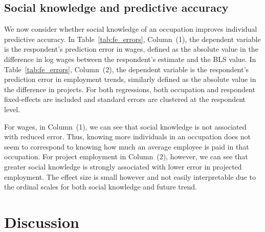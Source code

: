 \documentclass[11pt]{article}
\begin{document}


\subsection{Social knowledge and predictive accuracy}

We now consider whether social knowledge of an occupation improves individual predictive accuracy. 
In Table~\ref{tab:fe_errors}, Column~(1), the dependent variable is the respondent's prediction error in wages, defined as the absolute value in the difference in log wages between the respondent's estimate and the BLS value.  
In Table~\ref{tab:fe_errors}, Column~(2), the dependent variable is the respondent's prediction error in employment trends, similarly defined as the absolute value in the difference in projects. 
For both regressions, both occupation and respondent fixed-effects are included and standard errors are clustered at the respondent level.  



For wages, in Column~(1), we can see that social knowledge is not associated with reduced error. Thus, knowing more individuals in an occupation does not seem to correspond to knowing how much an average employee is paid in that occupation.
For project employment in Column~(2), however, we can see that greater social knowledge is strongly associated with lower error in projected employment. The effect size is small however and not easily interpretable due to the ordinal scales for both social knowledge and future trend.

\section{Discussion}
\end{document}
